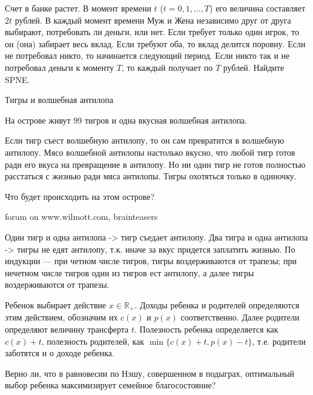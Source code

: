 \begin{problem}
 Счет в банке растет. В момент времени $t$ ($t=0,1,\ldots ,T$) его
величина составляет $2t$ рублей. В каждый момент времени Муж и
Жена независимо друг от друга выбирают, потребовать ли деньги, или
нет. Если требует только один игрок, то он (она) забирает весь
вклад. Если требуют оба, то вклад делится поровну. Если не
потребовал никто, то начинается следующий период. Если никто так и
не потребовал деньги к моменту $T$, то каждый получает по $T$
рублей. Найдите SPNE.



\begin{sol}

\end{sol}
\end{problem}




\begin{problem}
 Тигры и волшебная антилопа \par %
На острове живут 99 тигров и одна вкусная волшебная антилопа. \par
Если тигр съест волшебную антилопу, то он сам превратится в волшебную антилопу. Мясо волшебной антилопы настолько вкусно, что любой тигр готов ради его вкуса на превращение в антилопу. Но ни один тигр не готов полностью расстаться с жизнью ради мяса антилопы. Тигры охотяться только в одиночку.\par
Что будет происходить на этом острове? \par




\begin{source}
forum on www.wilmott.com, brainteasers
\end{source}


\begin{sol}
 Один тигр и одна антилопа -> тигр съедает антилопу. Два тигра и одна антилопа -> тигры не едят антилопу, т.к. иначе за вкус придется заплатить жизнью. По индукции — при четном числе тигров, тигры воздерживаются от трапезы; при нечетном числе тигров один из тигров ест антилопу, а далее тигры воздерживаются от трапезы.
\end{sol}
\end{problem}





\begin{problem}
 Ребенок выбирает действие $x\in \mathbb{R}_{+}$. Доходы ребенка и
родителей определяются этим действием, обозначим их $c(x)$ и
$p(x)$ соответственно. Далее родители определяют величину
трансферта $t$. Полезность ребенка определяется как $c(x)+t$,
полезность родителей, как $\min\{c(x)+t,p(x)-t\}$, т.е. родители
заботятся и о доходе ребенка. \par
Верно ли, что в равновесии по Нэшу, совершенном в подыграх,
оптимальный выбор ребенка максимизирует семейное благосостояние?



\begin{sol}

\end{sol}
\end{problem}



